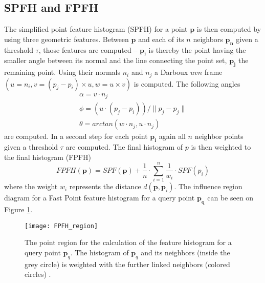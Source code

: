 \subsection{SPFH and FPFH}

The simplified point feature histogram (SPFH) for a point $\boldsymbol{p}$ is then computed by using three geometric features. Between $\boldsymbol{p}$ and each of its $n$ neighbors $\boldsymbol{p_n}$ given a threshold $\tau$, those features are computed -- $\boldsymbol{p_i}$ is thereby the point having the smaller angle between its normal and the line connecting the point set, $\boldsymbol{p_j}$ the remaining point. Using their normals $n_i$ and $n_j$ a Darboux $uvn$ frame $(u = n_i, v = (p_j - p_i) \times u, w = u \times v)$ is computed. The following angles
\begin{equation}
\begin{split}
\alpha = v \cdot n_j
\\
\phi = (u \cdot (p_j - p_i))/\|p_j - p_j\|
\\
\theta = arctan(w \cdot n_j, u \cdot n_j)
\end{split}
\label{eq:AngularVariations}
\end{equation}
are computed. In a second step for each point $\boldsymbol{p_i}$ again all $n$ neighbor points given a threshold $\tau$ are computed. The final histogram of $p$ is then weighted to the final histogram (FPFH)
\begin{equation}
FPFH(\boldsymbol{p}) = SPF(\boldsymbol{p}) + \frac{1}{n} \cdot \displaystyle\sum_{i=1}^{n}\frac{1}{w_i} \cdot SPF(p_i)
\end{equation}
where the weight $w_i$ represents the distance $d(\boldsymbol{p},\boldsymbol{p}_i)$. The influence region diagram for a Fast Point feature histogram for a query point $\boldsymbol{p_q}$ can be seen on Figure \ref{fig:FPFHregion}. 
\begin{figure}[H]
	\centering
	\texttt{[image: FPFH\_region]}
	\caption{The point region for the calculation of the feature histogram for a query point $\boldsymbol{p}_q$. The histogram of $\boldsymbol{p}_q$ and its neighbors (inside the grey circle) is weighted with the further linked neighbors (colored circles) \cite{FPFH}.}
	\label{fig:FPFHregion}
\end{figure}

